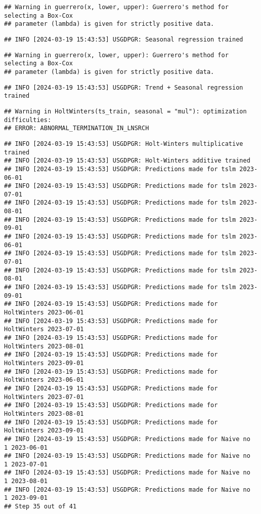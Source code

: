 \documentclass[
]{article}
\begin{document}
\begin{verbatim}
## Warning in guerrero(x, lower, upper): Guerrero's method for selecting a Box-Cox
## parameter (lambda) is given for strictly positive data.
\end{verbatim}

\begin{verbatim}
## INFO [2024-03-19 15:43:53] USGDPGR: Seasonal regression trained
\end{verbatim}

\begin{verbatim}
## Warning in guerrero(x, lower, upper): Guerrero's method for selecting a Box-Cox
## parameter (lambda) is given for strictly positive data.
\end{verbatim}

\begin{verbatim}
## INFO [2024-03-19 15:43:53] USGDPGR: Trend + Seasonal regression trained
\end{verbatim}

\begin{verbatim}
## Warning in HoltWinters(ts_train, seasonal = "mul"): optimization difficulties:
## ERROR: ABNORMAL_TERMINATION_IN_LNSRCH
\end{verbatim}

\begin{verbatim}
## INFO [2024-03-19 15:43:53] USGDPGR: Holt-Winters multiplicative trained
## INFO [2024-03-19 15:43:53] USGDPGR: Holt-Winters additive trained
## INFO [2024-03-19 15:43:53] USGDPGR: Predictions made for tslm 2023-06-01
## INFO [2024-03-19 15:43:53] USGDPGR: Predictions made for tslm 2023-07-01
## INFO [2024-03-19 15:43:53] USGDPGR: Predictions made for tslm 2023-08-01
## INFO [2024-03-19 15:43:53] USGDPGR: Predictions made for tslm 2023-09-01
## INFO [2024-03-19 15:43:53] USGDPGR: Predictions made for tslm 2023-06-01
## INFO [2024-03-19 15:43:53] USGDPGR: Predictions made for tslm 2023-07-01
## INFO [2024-03-19 15:43:53] USGDPGR: Predictions made for tslm 2023-08-01
## INFO [2024-03-19 15:43:53] USGDPGR: Predictions made for tslm 2023-09-01
## INFO [2024-03-19 15:43:53] USGDPGR: Predictions made for HoltWinters 2023-06-01
## INFO [2024-03-19 15:43:53] USGDPGR: Predictions made for HoltWinters 2023-07-01
## INFO [2024-03-19 15:43:53] USGDPGR: Predictions made for HoltWinters 2023-08-01
## INFO [2024-03-19 15:43:53] USGDPGR: Predictions made for HoltWinters 2023-09-01
## INFO [2024-03-19 15:43:53] USGDPGR: Predictions made for HoltWinters 2023-06-01
## INFO [2024-03-19 15:43:53] USGDPGR: Predictions made for HoltWinters 2023-07-01
## INFO [2024-03-19 15:43:53] USGDPGR: Predictions made for HoltWinters 2023-08-01
## INFO [2024-03-19 15:43:53] USGDPGR: Predictions made for HoltWinters 2023-09-01
## INFO [2024-03-19 15:43:53] USGDPGR: Predictions made for Naive no  1 2023-06-01
## INFO [2024-03-19 15:43:53] USGDPGR: Predictions made for Naive no  1 2023-07-01
## INFO [2024-03-19 15:43:53] USGDPGR: Predictions made for Naive no  1 2023-08-01
## INFO [2024-03-19 15:43:53] USGDPGR: Predictions made for Naive no  1 2023-09-01
## Step 35 out of 41
\end{verbatim}
\end{document}
